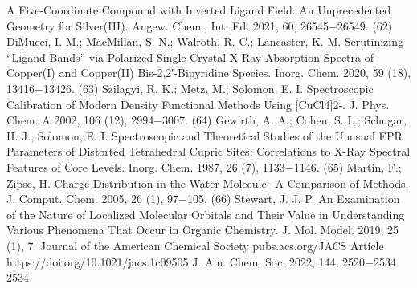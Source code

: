 \documentclass{article}
\begin{document}
A Five-Coordinate Compound with Inverted Ligand Field: An
Unprecedented Geometry for Silver(III). Angew. Chem., Int. Ed. 2021,
60, 26545−26549.
(62) DiMucci, I. M.; MacMillan, S. N.; Walroth, R. C.; Lancaster, K.
M. Scrutinizing “Ligand Bands” via Polarized Single-Crystal X-Ray
Absorption Spectra of Copper(I) and Copper(II) Bis-2,2′-Bipyridine
Species. Inorg. Chem. 2020, 59 (18), 13416−13426.
(63) Szilagyi, R. K.; Metz, M.; Solomon, E. I. Spectroscopic
Calibration of Modern Density Functional Methods Using [CuCl4]2‑.
J. Phys. Chem. A 2002, 106 (12), 2994−3007.
(64) Gewirth, A. A.; Cohen, S. L.; Schugar, H. J.; Solomon, E. I.
Spectroscopic and Theoretical Studies of the Unusual EPR
Parameters of Distorted Tetrahedral Cupric Sites: Correlations to
X-Ray Spectral Features of Core Levels. Inorg. Chem. 1987, 26 (7),
1133−1146.
(65) Martin, F.; Zipse, H. Charge Distribution in the Water
Molecule−A Comparison of Methods. J. Comput. Chem. 2005, 26 (1),
97−105.
(66) Stewart, J. J. P. An Examination of the Nature of Localized
Molecular Orbitals and Their Value in Understanding Various
Phenomena That Occur in Organic Chemistry. J. Mol. Model. 2019,
25 (1), 7.
Journal of the American Chemical Society
pubs.acs.org/JACS
Article
https://doi.org/10.1021/jacs.1c09505
J. Am. Chem. Soc. 2022, 144, 2520−2534
2534

\newpage
\end{document}
